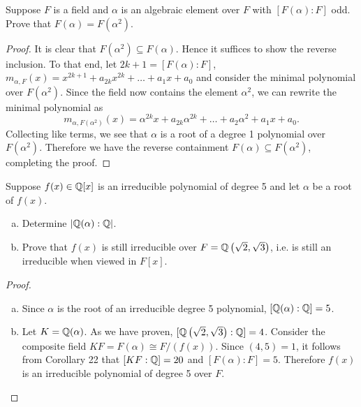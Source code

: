 \documentclass[10pt]{amsart}
\begin{document}
\begin{thm}
  \label{Ex5}
  Suppose $F$ is a field and $\alpha$ is an algebraic element over $F$ with $[F(\alpha):F]$ odd.
  Prove that $F(\alpha) = F(\alpha^2)$.
  
  \begin{proof}
    It is clear that $F(\alpha^2) \subseteq F(\alpha)$.  
    Hence it suffices to show the reverse inclusion.
    To that end, let $2k+1 = [F(\alpha):F]$, $m_{\alpha,F}(x) = x^{2k+1} + a_{2k}x^{2k} + \ldots + a_1x + a_0$ and consider the minimal polynomial over $F(\alpha^2)$. 
    Since the field now contains the element $\alpha^2$, we can rewrite the minimal polynomial as
    $$m_{\alpha,F(\alpha^2)}(x) = \alpha^{2k}x + a_{2k}\alpha^{2k} + \ldots + a_2\alpha^2 + a_1x + a_0.$$
    Collecting like terms, we see that $\alpha$ is a root of a degree 1 polynomial over $F(\alpha^2)$.
    Therefore we have the reverse containment $F(\alpha) \subseteq F(\alpha^2)$, completing the proof.
  \end{proof}
\end{thm}

\begin{thm}
  \label{Ex6}
  Suppose $f(x) \in \mathbb{Q}[x]$ is an irreducible polynomial of degree 5 and let $\alpha$ be a root of $f(x)$.
  \begin{enumerate}[(a)]
  \item
    Determine $\left\lvert \mathbb{Q}(\alpha):\mathbb{Q} \right\rvert$.
  \item
    Prove that $f(x)$ is still irreducible over $F = \mathbb{Q}\left(\sqrt{2},\sqrt{3}\right)$, i.e. is still an irreducible when viewed in $F[x]$.
  \end{enumerate}
  
  \begin{proof}
    \begin{enumerate}[(a)]
    \item
      Since $\alpha$ is the root of an irreducible degree 5 polynomial, $[\mathbb{Q}(\alpha): \mathbb{Q}] = 5$.
    \item
      Let $K = \mathbb{Q}(\alpha)$.
      As we have proven, $[\mathbb{Q}\left(\sqrt{2},\sqrt{3}\right):\mathbb{Q}] = 4$.
      Consider the composite field $KF = F(\alpha) \cong F/(f(x))$.
      Since $(4,5) = 1$, it follows from Corollary 22 that $[KF:\mathbb{Q}] = 20$ and $[F(\alpha):F] = 5$.
      Therefore $f(x)$ is an irreducible polynomial of degree 5 over $F$.
    \end{enumerate}
  \end{proof}
\end{thm}
\end{document}
